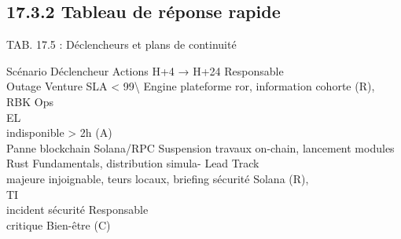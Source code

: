 \subsection{17.3.2 Tableau de réponse rapide}
\vspace{0.5em}
\begin{center}\begin{tabular}TAB. 17.5 : Déclencheurs et plans de continuité\end{tabular}\end{center}
\vspace{0.5em}
\vspace{0.5em}
Scénario           Déclencheur         Actions H+4 → H+24                                                                            Responsable\\
Outage Venture     SLA \textless{} 99\textbackslash{}%
Engine             plateforme          ror, information cohorte                                                                      (R), RBK Ops\\
\vspace{0.5em}
\vspace{0.5em}
\vspace{0.5em}
\vspace{0.5em}
EL\\
indisponible \textgreater{} 2h                                                                                                 (A)\\
Panne blockchain Solana/RPC            Suspension travaux on-chain, lancement modules Rust Fundamentals, distribution simula- Lead Track\\
majeure            injoignable,        teurs locaux, briefing sécurité                                                               Solana (R),\\
\vspace{0.5em}
\vspace{0.5em}
\vspace{0.5em}
\vspace{0.5em}
TI\\
incident sécurité                                                                                                 Responsable\\
critique                                                                                                          Bien-être (C)\\
